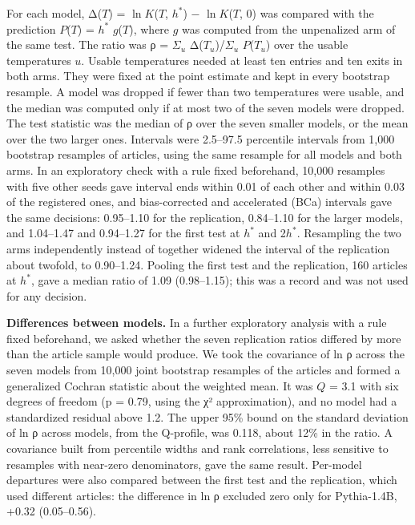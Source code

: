 \documentclass[aps,prx,onecolumn,superscriptaddress,longbibliography]{revtex4-2}
\begin{document}
For each model, Δ(\(T\)) = \(\ln K\)(\(T\), \(h^*\)) − \(\ln K\)(\(T\), 0) was compared with the prediction \(P\)(\(T\)) = \(h^*\) \(g\)(\(T\)), where \(g\) was computed from the unpenalized arm of the same test. The ratio was ρ = \(\Sigma_{u}\) Δ(\(T_{u}\))/\(\Sigma_{u}\) \(P\)(\(T_{u}\)) over the usable temperatures \(u\). Usable temperatures needed at least ten entries and ten exits in both arms. They were fixed at the point estimate and kept in every bootstrap resample. A model was dropped if fewer than two temperatures were usable, and the median was computed only if at most two of the seven models were dropped. The test statistic was the median of ρ over the seven smaller models, or the mean over the two larger ones. Intervals were 2.5--97.5 percentile intervals from 1,000 bootstrap resamples of articles, using the same resample for all models and both arms. In an exploratory check with a rule fixed beforehand, 10,000 resamples with five other seeds gave interval ends within 0.01 of each other and within 0.03 of the registered ones, and bias-corrected and accelerated (BCa) intervals gave the same decisions: 0.95--1.10 for the replication, 0.84--1.10 for the larger models, and 1.04--1.47 and 0.94--1.27 for the first test at \(h^*\) and 2\(h^*\). Resampling the two arms independently instead of together widened the interval of the replication about twofold, to 0.90--1.24. Pooling the first test and the replication, 160 articles at \(h^*\), gave a median ratio of 1.09 (0.98--1.15); this was a record and was not used for any decision.

\textbf{Differences between models.} In a further exploratory analysis with a rule fixed beforehand, we asked whether the seven replication ratios differed by more than the article sample would produce. We took the covariance of ln ρ across the seven models from 10,000 joint bootstrap resamples of the articles and formed a generalized Cochran statistic about the weighted mean. It was \(Q\) = 3.1 with six degrees of freedom (p = 0.79, using the χ² approximation), and no model had a standardized residual above 1.2. The upper 95\% bound on the standard deviation of ln ρ across models, from the Q-profile, was 0.118, about 12\% in the ratio. A covariance built from percentile widths and rank correlations, less sensitive to resamples with near-zero denominators, gave the same result. Per-model departures were also compared between the first test and the replication, which used different articles: the difference in ln ρ excluded zero only for Pythia-1.4B, +0.32 (0.05--0.56).
\end{document}
